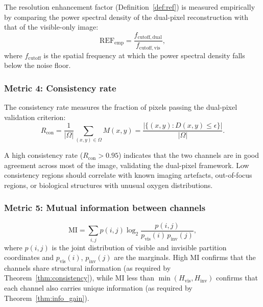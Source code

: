 \documentclass[11pt,twocolumn,a4paper]{article}
\begin{document}
The resolution enhancement factor (Definition~\ref{def:ref}) is measured empirically by comparing the power spectral density of the dual-pixel reconstruction with that of the visible-only image:
\begin{equation}\label{eq:ref_empirical}
\mathrm{REF}_{\mathrm{emp}} = \frac{f_{\mathrm{cutoff,dual}}}{f_{\mathrm{cutoff,vis}}},
\end{equation}
where $f_{\mathrm{cutoff}}$ is the spatial frequency at which the power spectral density falls below the noise floor.

\subsubsection{Metric 4: Consistency rate}

The consistency rate measures the fraction of pixels passing the dual-pixel validation criterion:
\begin{equation}\label{eq:consistency_rate}
R_{\mathrm{con}} = \frac{1}{|\Omega|}\sum_{(x,y) \in \Omega} M(x,y) = \frac{|\{(x,y) : D(x,y) \leq \epsilon\}|}{|\Omega|}.
\end{equation}

A high consistency rate ($R_{\mathrm{con}} > 0.95$) indicates that the two channels are in good agreement across most of the image, validating the dual-pixel framework.
Low consistency regions should correlate with known imaging artefacts, out-of-focus regions, or biological structures with unusual oxygen distributions.



\subsubsection{Metric 5: Mutual information between channels}

\begin{equation}\label{eq:mi}
\mathrm{MI} = \sum_{i,j} p(i,j) \log_2 \frac{p(i,j)}{p_{\mathrm{vis}}(i)\, p_{\mathrm{inv}}(j)},
\end{equation}
where $p(i,j)$ is the joint distribution of visible and invisible partition coordinates and $p_{\mathrm{vis}}(i)$, $p_{\mathrm{inv}}(j)$ are the marginals.
High MI confirms that the channels share structural information (as required by Theorem~\ref{thm:consistency}), while MI less than $\min(H_{\mathrm{vis}}, H_{\mathrm{inv}})$ confirms that each channel also carries unique information (as required by Theorem~\ref{thm:info_gain}).
\end{document}
